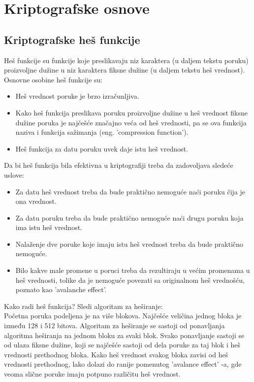 \documentclass[a4paper]{article}
\begin{document}
{\section{Kriptografske osnove}	
\label{sec:kriptografske_osnove}

\subsection{Kriptografske heš funkcije}
Heš funkcije su funkcije koje preslikavaju niz karaktera (u daljem tekstu poruku) proizvoljne dužine u niz karaktera fiksne dužine (u daljem tekstu heš vrednost). Osnovne osobine heš funkcije su:
\begin{itemize}
\item Heš vrednost poruke je brzo izračunljiva.
\item Kako heš funkcija preslikava poruku proizvoljne dužine u heš vrednost fiksne dužine poruka je najčešće značajno veća od heš vrednosti, pa se ova funkcija naziva i funkcija sažimanja (eng. 'compression function').
\item Heš funkcija za datu poruku uvek daje istu heš vrednost.
\end{itemize}
Da bi heš funkcija bila efektivna u kriptografiji treba da zadovoljava sledeće uslove:
\begin{itemize}
\item Za datu heš vrednost treba da bude praktično nemoguće naći poruku čija je ona vrednost.
\item Za datu poruku treba da bude praktično nemoguće naći drugu poruku koja ima istu heš vrednost.
\item Nalaženje dve poruke koje imaju istu heš vrednost treba da bude praktično nemoguće. 
\item Bilo kakve male promene u poruci treba da rezultiraju u većim promenama u heš vrednosti, tolike da je nemoguće povezati sa originalnom heš vrednošću, poznato kao 'avalanche effect'.
\end{itemize}
Kako radi heš funkcija? Sledi algoritam za heširanje:\\
Početna poruka podeljena je na više blokova. Najčešće veličina jednog bloka je između 128 i 512 bitova. Algoritam za heširanje se sastoji od ponavljanja algoritma heširanja na jednom bloku za svaki blok. Svako ponavljanje sastoji se od ulaza fiksne dužine, koji se najčešće sastoji od dela poruke za taj blok i heš vrednosti prethodnog bloka. Kako heš vrednost svakog bloka zavisi od heš vrednosti prethodnog, lako dolazi do ranije pomenutog 'avalance effect' -a, gde veoma slične poruke imaju potpuno različitu heš vrednost.

}
\end{document}
